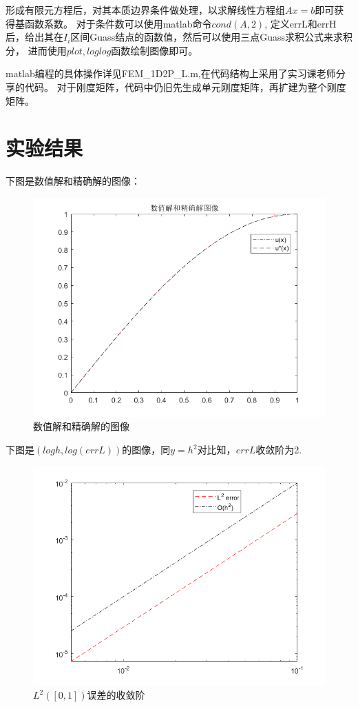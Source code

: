 \documentclass{article}
\begin{document}
形成有限元方程后，对其本质边界条件做处理，以求解线性方程组$Ax=b$即可获得基函数系数。
对于条件数可以使用matlab命令$cond(A,2)$,
定义errL和errH后，给出其在$ I_{i}$区间Guass结点的函数值，然后可以使用三点Guass求积公式来求积分，
进而使用$plot,loglog$函数绘制图像即可。

matlab编程的具体操作详见FEM\_1D2P\_L.m,在代码结构上采用了实习课老师分享的代码。
对于刚度矩阵，代码中仍旧先生成单元刚度矩阵，再扩建为整个刚度矩阵。


\newpage
\section{实验结果}

下图是数值解和精确解的图像：
\begin{figure}[H]
\centering
\includegraphics[scale=0.6]{solution_image.png}
\caption{\label{solution_image}数值解和精确解的图像}
\end{figure}

下图是$(logh,log(errL))$的图像，同$y=h^2$对比知，$errL$收敛阶为2.
\begin{figure}[H]
\centering
\includegraphics[scale=0.6]{L_err.png}
\caption{\label{L_err}$L^{2}([0,1])$误差的收敛阶}
\end{figure}
\end{document}
